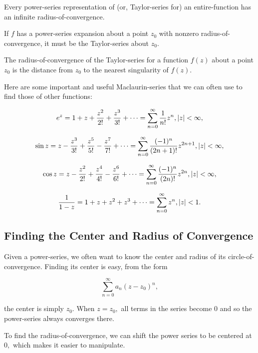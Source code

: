 \documentclass{article}
\begin{document}
\begin{theorem}
Every \@{power-series} representation of (or, \@{Taylor-series} for) an \@{entire-function} has an infinite \@{radius-of-convergence}.
\end{theorem}

\begin{theorem}
If $f$ has a \@{power-series} expansion about a point $z_0$ with nonzero \@{radius-of-convergence}, it must be the \@{Taylor-series} about $z_0$.
\end{theorem}

\begin{theorem}
The \@{radius-of-convergence} of the \@{Taylor-series} for a function $f(z)$ about a point $z_0$ is the distance from $z_0$ to the nearest \@{singularity} of $f(z)$.
\end{theorem}

Here are some important and useful \@{Maclaurin-series} that we can often use to find those of other functions:

\[ e^z = 1 + z + \frac{z^2}{2!} + \frac{z^3}{3!} + \cdots = \sum_{n=0}^{\infty} \frac{1}{n!}z^n, \left| z \right| < \infty, \]

\[ \sin{z} = z - \frac{z^3}{3!} + \frac{z^5}{5!} - \frac{z^7}{7!} + \cdots = \sum_{n=0}^{\infty} \frac{(-1)^n}{(2n+1)!}z^{2n+1}, \left| z \right| < \infty, \]

\[ \cos{z} = z - \frac{z^2}{2!} + \frac{z^4}{4!} - \frac{z^6}{6!} + \cdots = \sum_{n=0}^{\infty} \frac{(-1)^n}{(2n)!}z^{2n}, \left| z \right| < \infty, \]

\[ \frac{1}{1 - z} = 1 + z + z^2 + z^3 + \cdots = \sum_{n = 0}^{\infty} z^n, \left| z \right| < 1. \]

\subsection{Finding the Center and Radius of Convergence}

Given a \@{power-series}, we often want to know the center and radius of its \@{circle-of-convergence}. Finding its center is easy, from the form

\[ \sum_{n=0}^{\infty} a_n (z - z_0)^n, \]

the center is simply $z_0.$ When $z = z_0,$ all terms in the series become $0$ and so the \@{power-series} always \@{converges} there.

To find the \@{radius-of-convergence}, we can shift the power series to be centered at $0,$ which makes it easier to manipulate.
\end{document}
